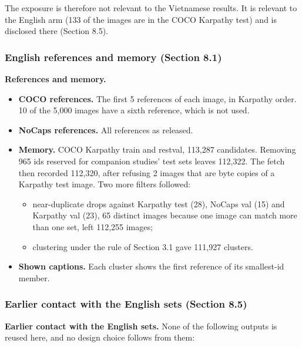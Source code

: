 \documentclass[manuscript,screen]{acmart}
\providecommand{\tightlist}{\setlength{\itemsep}{0pt}\setlength{\parskip}{0pt}}
\begin{document}
The exposure is therefore not relevant to the Vietnamese results. It is relevant to the English arm
(133 of the images are in the COCO Karpathy test) and is disclosed there (Section 8.5).

\subsubsection{English references and memory (Section
8.1)}\label{english-references-and-memory-section-8.1}

\textbf{References and memory.}

\begin{itemize}
\tightlist
\item
  \textbf{COCO references.} The first 5 references of each image, in Karpathy order. 10 of the 5,000
  images have a sixth reference, which is not used.
\item
  \textbf{NoCaps references.} All references as released.
\item
  \textbf{Memory.} COCO Karpathy train and restval, 113,287 candidates. Removing 965 ids reserved
  for companion studies' test sets leaves 112,322. The fetch then recorded 112,320, after refusing 2
  images that are byte copies of a Karpathy test image. Two more filters followed:

  \begin{itemize}
  \tightlist
  \item
    near-duplicate drops against Karpathy test (28), NoCaps val (15) and Karpathy val (23), 65
    distinct images because one image can match more than one set, left 112,255 images;
  \item
    clustering under the rule of Section 3.1 gave 111,927 clusters.
  \end{itemize}
\item
  \textbf{Shown captions.} Each cluster shows the first reference of its smallest-id member.
\end{itemize}

\subsubsection{Earlier contact with the English sets (Section
8.5)}\label{earlier-contact-with-the-english-sets-section-8.5}

\textbf{Earlier contact with the English sets.} None of the following outputs is reused here, and no
design choice follows from them:
\end{document}

